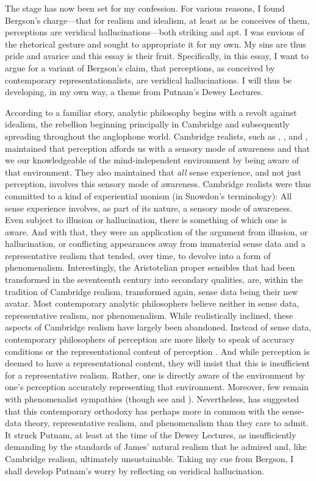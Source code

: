 \documentclass[12pt]{article}
\begin{document}
The stage has now been set for my confession. For various reasons, I found Bergson's charge---that for realism and idealism, at least as he conceives of them, perceptions are veridical hallucinations---both striking and apt. I was envious of the rhetorical gesture and sought to appropriate it for my own. My sins are thus pride and avarice and this essay is their fruit. Specifically, in this essay, I want to argue for a variant of Bergson's claim, that perceptions, as conceived by contemporary representationalists, are veridical hallucinations. I will thus be developing, in my own way, a theme from Putnam's Dewey Lectures.

According to a familiar story, analytic philosophy begins with a revolt against idealism, the rebellion beginning principally in Cambridge and subsequently spreading throughout the anglophone world. Cambridge realists, such as \cite{Russell:1912uq}, \citet{Moore:1953nx}, and \citet{Price:1932fk}, maintained that perception affords us with a sensory mode of awareness and that we our knowledgeable of the mind-independent environment by being aware of that environment. They also maintained that \emph{all} sense experience, and not just perception, involves this sensory mode of awareness. Cambridge realists were thus committed to a kind of experiential monism (in Snowdon's \citeyear{Snowdon:2008oz} terminology): All sense experience involves, as part of its nature, a sensory mode of awareness. Even subject to illusion or hallucination, there is something of which one is aware. And with that, they were an application of the argument from illusion, or hallucination, or conflicting appearances away from immaterial sense data and a representative realism that tended, over time, to devolve into a form of phenomenalism. Interestingly, the Aristotelian proper sensibles that had been transformed in the seventeenth century into secondary qualities, are, within the tradition of Cambridge realism, transformed again, sense data being their new avatar. Most contemporary analytic philosophers believe neither in sense data, representative realism, nor phenomenalism. While realistically inclined, these aspects of Cambridge realism have largely been abandoned. Instead of sense data, contemporary philosophers of perception are more likely to speak of accuracy conditions or the representational content of perception \citep[though see][]{Robinson:1994ms}. And while perception is deemed to have a representational content, they will insist that this is insufficient for a representative realism. Rather, one is directly aware of the environment by one's perception accurately representing that environment. Moreover, few remain with phenomenalist sympathies (though see \citealt{Foster:2000ny} and \citealt{Noe:2004fk}). Nevertheless, \citet{Putnam:1994kx} has suggested that this contemporary orthodoxy has perhaps more in common with the sense-data theory, representative realism, and phenomenalism than they care to admit. It struck Putnam, at least at the time of the Dewey Lectures, as insufficiently demanding by the standards of James' natural realism that he admired and, like Cambridge realism, ultimately unsustainable. Taking my cue from Bergson, I shall develop Putnam's worry by reflecting on veridical hallucination.
\end{document}
